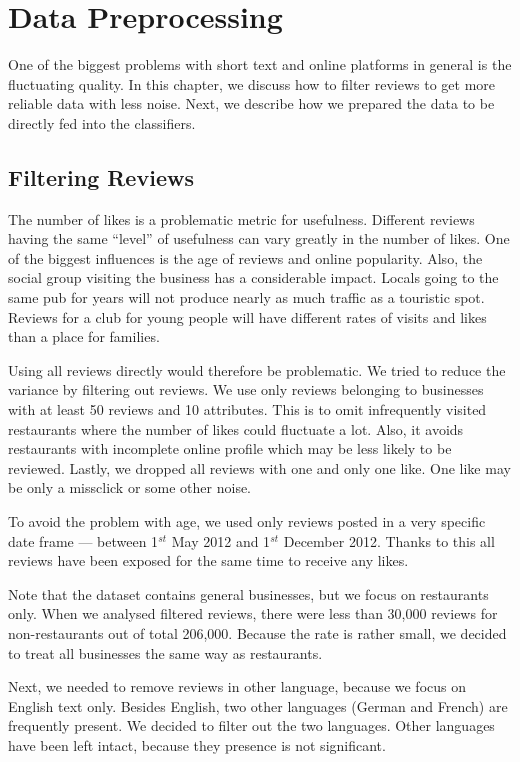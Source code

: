 \chapter{Data Preprocessing}\label{app:prepr}

One of the biggest problems with short text and online platforms in general is
the fluctuating quality.
In this chapter, we discuss how to filter reviews to get more reliable data with
less noise.
Next, we describe how we prepared the data to be directly fed into the classifiers.


\section{Filtering Reviews}

The number of likes is a problematic metric for usefulness.
Different reviews having the same ``level'' of usefulness can vary greatly
in the number of likes.
One of the biggest influences is the age of reviews and online popularity.
Also, the social group visiting the business has a considerable impact.
Locals going to the same pub for years will not produce nearly as much traffic
as a touristic spot.
Reviews for a club for young people will have different rates of visits and likes
than a place for families.

Using all reviews directly would therefore be problematic.
We tried to reduce the variance by filtering out reviews.
We use only reviews belonging to businesses with at least 50 reviews and 10 attributes.
This is to omit infrequently visited restaurants where the number of likes could fluctuate a lot.
Also, it avoids restaurants with incomplete online profile which may be less likely to be reviewed.
Lastly, we dropped all reviews with one and only one like.
One like may be only a missclick or some other noise.

To avoid the problem with age, we used only reviews posted in a very specific date frame
--- between 1$^{st}$ May 2012 and 1$^{st}$ December 2012.
Thanks to this all reviews have been exposed for the same time to receive any likes.

Note that the dataset contains general businesses, but we focus on restaurants only.
When we analysed filtered reviews,
there were less than 30,000 reviews for non-restaurants out of total 206,000.
Because the rate is rather small,
we decided to treat all businesses the same way as restaurants.

Next, we needed to remove reviews in other language, because
we focus on English text only.
Besides English, two other languages (German and French) are frequently present.
We decided to filter out the two languages.
Other languages have been left intact, because they presence is not significant.


